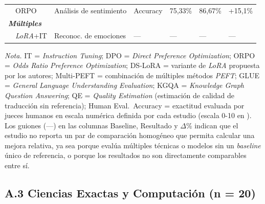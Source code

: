 \begin{longtable}{p{3.5cm} p{1.7cm} p{3.0cm} p{1.8cm} p{1.3cm} p{1.3cm} p{0.9cm}}
\scriptsize\autocite{shen2025ft} & \scriptsize ORPO & \scriptsize Análisis de sentimiento & \scriptsize Accuracy & \scriptsize 75,33\% & \scriptsize 86,67\% & \scriptsize +15,1\% \\
\multicolumn{7}{l}{\scriptsize\textbf{\textit{Múltiples}}} \\[2pt]
\scriptsize\autocite{sun2025dialoguemllm} & \scriptsize\textit{LoRA}+IT & \scriptsize Reconoc. de emociones & \scriptsize --- & \scriptsize --- & \scriptsize --- & \scriptsize --- \\
\end{longtable}

\begin{flushleft}
\scriptsize
\textit{Nota.} IT = \textit{Instruction Tuning}; DPO = \textit{Direct Preference Optimization}; ORPO = \textit{Odds Ratio Preference Optimization}; DS-LoRA = variante de \textit{LoRA} propuesta por los autores; Multi-PEFT = combinación de múltiples métodos \textit{PEFT}; GLUE = \textit{General Language Understanding Evaluation}; KGQA = \textit{Knowledge Graph Question Answering}; QE = \textit{Quality Estimation} (estimación de calidad de traducción sin referencia); Human Eval.\ Accuracy = exactitud evaluada por jueces humanos en escala numérica definida por cada estudio (escala 0-10 en \autocite{anghel2025courseeval}). Los guiones (---) en las columnas Baseline, Resultado y $\Delta$\% indican que el estudio no reporta un par de comparación homogéneo que permita calcular una mejora relativa, ya sea porque evalúa múltiples técnicas o modelos sin un \textit{baseline} único de referencia, o porque los resultados no son directamente comparables entre sí.
\end{flushleft}

\subsection*{A.3 \quad Ciencias Exactas y Computación \texorpdfstring{(n = 20)}{(n = 20)}}

